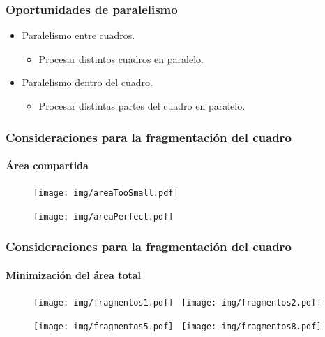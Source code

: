 \documentclass[11pt,a4paper,spanish]{beamer}
\begin{document}
\begin{frame}

\frametitle{Oportunidades de paralelismo}

\begin{itemize}

	\item Paralelismo entre cuadros.

\begin{itemize}

	\item Procesar distintos cuadros en paralelo.

\end{itemize}

	\item Paralelismo dentro del cuadro.

\begin{itemize}

	\item Procesar distintas partes del cuadro en paralelo.

\end{itemize}

\end{itemize}

\end{frame}

\begin{frame}

\frametitle{Consideraciones para la fragmentación del cuadro}

\framesubtitle{Área compartida}

\begin{figure}[h]

	\centering

	\texttt{[image: img/areaTooSmall.pdf]}

	\texttt{[image: img/areaPerfect.pdf]}

\end{figure}

\end{frame}

\begin{frame}

\frametitle{Consideraciones para la fragmentación del cuadro}

\framesubtitle{Minimización del área total}

\begin{figure}[h]

	\texttt{[image: img/fragmentos1.pdf]}~
	\texttt{[image: img/fragmentos2.pdf]}

	\texttt{[image: img/fragmentos5.pdf]}~
	\texttt{[image: img/fragmentos8.pdf]}

\end{figure}

\end{frame}
\end{document}
